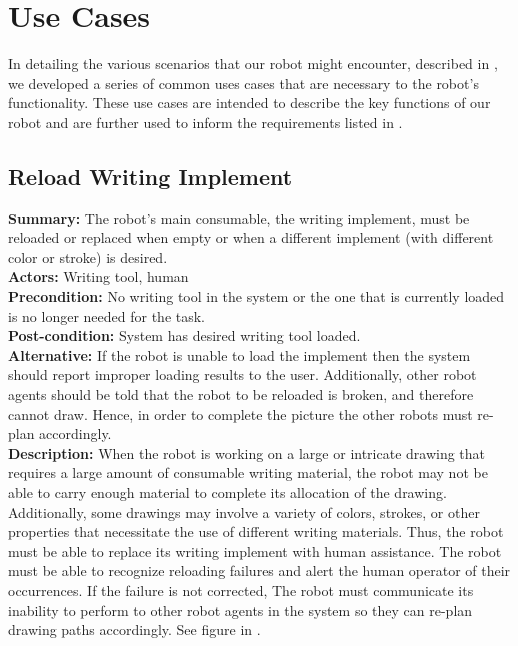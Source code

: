 
\section{Use Cases}
\label{sec:use_cases}
In detailing the various scenarios that our robot might encounter, described in , we developed a series of common uses cases that are necessary to the robot's functionality. These use cases are intended to describe the key functions of our robot and are further used to inform the requirements listed in .

\subsection{Reload Writing Implement}
\textbf{Summary:} The robot's main consumable, the writing implement, must be reloaded or replaced when empty or when a different implement (with different color or stroke) is desired. \\
\textbf{Actors:}  Writing tool, human \\
\textbf{Precondition:} No writing tool in the system or the one that is currently loaded is no longer needed for the task. \\
\textbf{Post-condition:} System has desired writing tool loaded. \\
\textbf{Alternative:} If the robot is unable to load the implement then the system should report improper loading results to the user. Additionally, other robot agents should be told that the robot to be reloaded is broken, and therefore cannot draw. Hence, in order to complete the picture the other robots must re-plan accordingly. \\
\textbf{Description:} When the robot is working on a large or intricate drawing that requires a large amount of consumable writing material, the robot may not be able to carry enough material to complete its allocation of the drawing. Additionally, some drawings may involve a variety of colors, strokes, or other properties that necessitate the use of different writing materials. Thus, the robot must be able to replace its writing implement with human assistance. The robot must be able to recognize reloading failures and alert the human operator of their occurrences. If the failure is not corrected, The robot must communicate its inability to perform to other robot agents in the system so they can re-plan drawing paths accordingly. See figure in .\\

